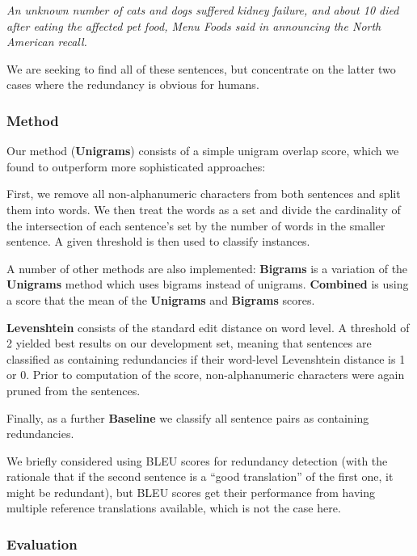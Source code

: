 \documentclass[a4paper,10pt]{scrartcl}
\theoremstyle{style}
\begin{document}
\textit{An unknown number of cats and dogs suffered kidney failure, and about 10 died after eating the affected pet food, Menu Foods said in announcing the North American recall.}

We are seeking to find all of these sentences, but concentrate on the latter two cases where the redundancy is obvious for humans.

\subsubsection{Method}

Our method (\textbf{Unigrams}) consists of a simple unigram overlap score, which we found to outperform more sophisticated approaches:

First, we remove all non-alphanumeric characters from both sentences and split them into words. We then treat the words as a set and divide the cardinality of the intersection of each sentence's set by the number of words in the smaller sentence. A given threshold is then used to classify instances.

A number of other methods are also implemented: \textbf{Bigrams} is a variation of the \textbf{Unigrams} method which uses bigrams instead of unigrams. \textbf{Combined} is using a score that the mean of the \textbf{Unigrams} and \textbf{Bigrams} scores.

\textbf{Levenshtein} consists of the standard edit distance\citep{levenshtein1966binary} on word level. A threshold of 2 yielded best results on our development set, meaning that sentences are classified as containing redundancies if their word-level Levenshtein distance is 1 or 0. Prior to computation of the score, non-alphanumeric characters were again pruned from the sentences.

Finally, as a further \textbf{Baseline} we classify all sentence pairs as containing redundancies.

We briefly considered using BLEU scores \citep{papineni2002bleu} for redundancy detection (with the rationale that if the second sentence is a ``good translation'' of the first one, it might be redundant), but BLEU scores get their performance from having multiple reference translations available, which is not the case here.

\subsubsection{Evaluation}
\end{document}
